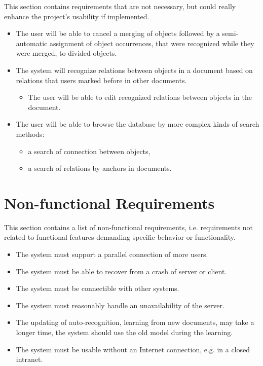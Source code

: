 This section contains requirements that are not necessary, but could really
enhance the project's usability if implemented.

\begin{itemize}
	\item The user will be able to cancel a merging of objects followed by
	a semi-automatic assignment of object occurrences, that were recognized
	while they were merged, to divided objects.
	\item The system will recognize relations between objects in a document
	based on relations that users marked before in other documents.
	\begin{itemize}
		\item The user will be able to edit recognized relations between objects
		in the document.
	\end{itemize}
	\item The user will be able to browse the database by more complex kinds of
	search methods:
	\begin{itemize}
		\item a search of connection between objects,
		\item a search of relations by anchors in documents.
	\end{itemize}
\end{itemize}

\section{Non-functional Requirements}

This section contains a list of non-functional requirements, i.e. requirements
not related to functional features demanding specific behavior or functionality.

\begin{itemize}
	\item The system must support a parallel connection of more users.
	\item The system must be able to recover from a crash of server or client.
	\item The system must be connectible with other systems.
	\item The system must reasonably handle an unavailability of the server.
	\item The updating of auto-recognition, learning from new documents,  may
	take a longer time, the system should use the old model during the learning.
	\item The system must be usable without an Internet connection, e.g. in
	a closed intranet.
\end{itemize}

